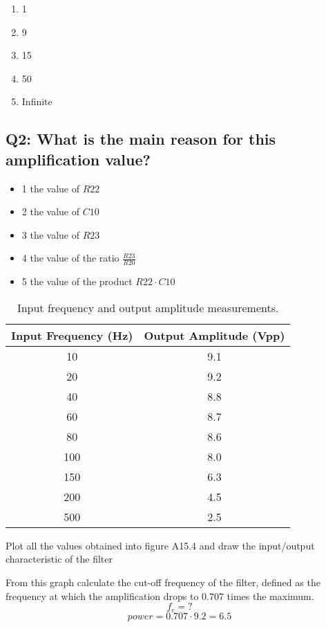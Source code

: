 \begin{enumerate}
    \item 1
    \item 9
    \item 15
    \item 50
    \item Infinite
\end{enumerate}

\subsection{Q2: What is the main reason for this amplification value?}
\begin{itemize}
    \item 1 the value of $R22$
    \item 2 the value of $C10$
    \item 3 the value of $R23$
    \item 4 the value of the ratio $\frac{R23}{R20}$
    \item 5 the value of the product $R22 \cdot C10$
\end{itemize}


\begin{table}[H]
    \centering
    \begin{tabular}{|c|c|}
        \hline
        \textbf{Input Frequency (Hz)} & \textbf{Output Amplitude (Vpp)} \\
        \hline
        10 & 9.1 \\
        20 & 9.2 \\
        40 & 8.8 \\
        60 & 8.7 \\
        80 & 8.6 \\
        100 & 8.0 \\
        150 & 6.3 \\
        200 & 4.5 \\
        500 & 2.5 \\
        \hline
    \end{tabular}
    \caption{Input frequency and output amplitude measurements.}
    \label{table:A15.1}
\end{table}

Plot all the values obtained into figure A15.4 and draw the
input/output characteristic of the filter

From this graph calculate the cut-off frequency of the filter, defined
as the frequency at which the amplification drops to 0.707 times the
maximum. 
$$ f_c = ? $$
$$ power = 0.707 \cdot 9.2 = 6.5 $$

